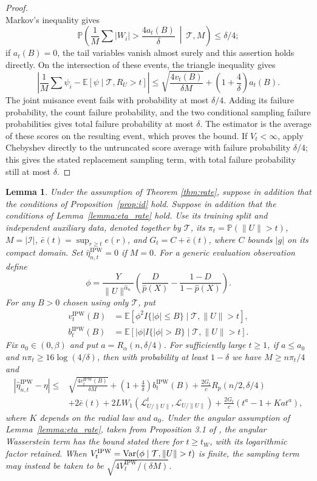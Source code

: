 \documentclass[12pt]{article}
\theoremstyle{plain}
\newtheorem{lemma}[theorem]{Lemma}
\theoremstyle{definition}
\begin{document}
\begin{proof}
\[\]
 Markov's inequality gives 
\[
\mathbb P\left(\frac1M\sum|W_i|>\frac{4a_t(B)}\delta\ \middle|\ \mathcal T,M\right)\leq\delta/4;
\]
 if $a_t(B)=0$, the tail variables vanish almost surely and this assertion holds directly. On the intersection of these events, the triangle inequality gives 
\[
\left|\frac1M\sum\psi_i-\mathbb E[\psi\mid\mathcal T,R_U>t]\right|\leq\sqrt{\frac{4v_t(B)}{\delta M}}+\left(1+\frac4\delta\right)a_t(B).
\]
 The joint nuisance event fails with probability at most $\delta/4$. Adding its failure probability, the count failure probability, and the two conditional sampling failure probabilities gives total failure probability at most $\delta$. The estimator is the average of these scores on the resulting event, which proves the bound. If $V_t<\infty$, apply Chebyshev directly to the untruncated score average with failure probability $\delta/4$; this gives the stated replacement sampling term, with total failure probability still at most $\delta$.
\end{proof}


\begin{lemma}\label{lemma:eta_ipw}
Under the assumption of Theorem \ref{thm:rate}, suppose in addition that the conditions of Proposition~\ref{prop:id} hold. Suppose in addition that the conditions of Lemma~\ref{lemma:eta_rate} hold. Use its training split and independent auxiliary data, denoted together by $\mathcal T$, its $\pi_t=\mathbb P(\|U\|>t)$, $M=|\mathcal I|$, $\bar e(t)=\sup_{r\geq t}e(r)$, and $G_t=C+\bar e(t)$, where $C$ bounds $|g|$ on its compact domain. Set $\hat\eta_{n,t}^{\text{IPW}}=0$ if $M=0$. For a generic evaluation observation define 
\[
\phi=\frac{Y}{\|U\|^{\hat\alpha_n}}\left(\frac{D}{\hat p(X)}-\frac{1-D}{1-\hat p(X)}\right).
\]
 For any $B>0$ chosen using only $\mathcal T$, put 
\[
\begin{aligned} v_t^{\text{IPW}}(B)&=\mathbb E[\phi^2 I\{|\phi|\leq B\}\mid\mathcal T,\|U\|>t],\\ b_t^{\text{IPW}}(B)&=\mathbb E[|\phi|I\{|\phi|>B\}\mid\mathcal T,\|U\|>t].\end{aligned}
\]
 Fix $a_0\in(0,\beta)$ and put $a=R_\alpha(n,\delta/4)$. For sufficiently large $t\geq1$, if $a\leq a_0$ and $n\pi_t\geq16\log(4/\delta)$, then with probability at least $1-\delta$ we have $M\geq n\pi_t/4$ and 
\[
\begin{aligned} |\hat\eta_{n,t}^{\text{IPW}}-\eta|\leq{}&\sqrt{\frac{4v_t^{\text{IPW}}(B)}{\delta M}}+\left(1+\frac4\delta\right)b_t^{\text{IPW}}(B)+\frac{2G_t}{c}R_p(n/2,\delta/4)\\ &+2\bar e(t)+2L W_1(\mathcal L_{U/\|U\|}^t,\mathcal L_{U/\|U\|})+\frac{2G_t}{c}(t^a-1+K a t^a),\end{aligned}
\]
 where $K$ depends on the radial law and $a_0$. Under the angular assumption of Lemma~\ref{lemma:eta_rate}, taken from Proposition 3.1 of \citet{zhang2023wasserstein}, the angular Wasserstein term has the bound stated there for $t\geq t_W$, with its logarithmic factor retained. When $V_t^{\text{IPW}}=\tmop{Var}(\phi\mid\mathcal T,\|U\|>t)$ is finite, the sampling term may instead be taken to be $\sqrt{4V_t^{\text{IPW}}/(\delta M)}$.
\end{lemma}
\end{document}

